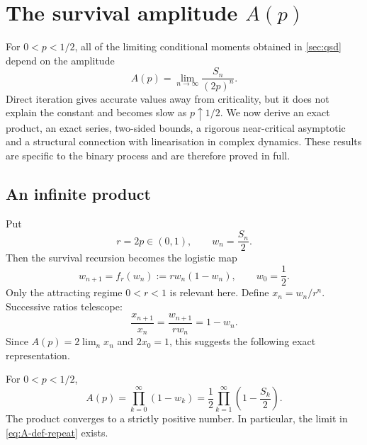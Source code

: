 \section{The survival amplitude \texorpdfstring{\(A(p)\)}{A(p)}}
\label{sec:constant-A}

For \(0<p<1/2\), all of the limiting conditional moments obtained in
\cref{sec:qsd} depend on the amplitude
\begin{equation}
  A(p)=\lim_{n\to\infty}\frac{S_n}{(2p)^n}.
  \label{eq:A-def-repeat}
\end{equation}
Direct iteration gives accurate values away from criticality, but it does not
explain the constant and becomes slow as \(p\uparrow1/2\).  We now derive an exact
product, an exact series, two-sided bounds, a rigorous near-critical asymptotic and
a structural connection with linearisation in complex dynamics.  These results are
specific to the binary process and are therefore proved in full.

\subsection{An infinite product}
\label{sec:A-product}

Put
\begin{equation}
  r=2p\in(0,1),
  \qquad
  w_n=\frac{S_n}{2}.
\end{equation}
Then the survival recursion becomes the logistic map
\begin{equation}
  w_{n+1}=f_r(w_n):=rw_n(1-w_n),
  \qquad w_0=\frac12.
  \label{eq:logistic-map}
\end{equation}
Only the attracting regime \(0<r<1\) is relevant here.  Define
\(x_n=w_n/r^n\).  Successive ratios telescope:
\begin{equation}
  \frac{x_{n+1}}{x_n}
  =\frac{w_{n+1}}{rw_n}=1-w_n.
  \label{eq:x-ratio}
\end{equation}
Since \(A(p)=2\lim_nx_n\) and \(2x_0=1\), this suggests the following exact
representation.

\begin{proposition}
\label{prop:A-product}
For \(0<p<1/2\),
\begin{equation}
  A(p)=\prod_{k=0}^{\infty}(1-w_k)
  =\frac12\prod_{k=1}^{\infty}\left(1-\frac{S_k}{2}\right).
  \label{eq:A-product}
\end{equation}
The product converges to a strictly positive number.  In particular, the limit in
\cref{eq:A-def-repeat} exists.
\end{proposition}

